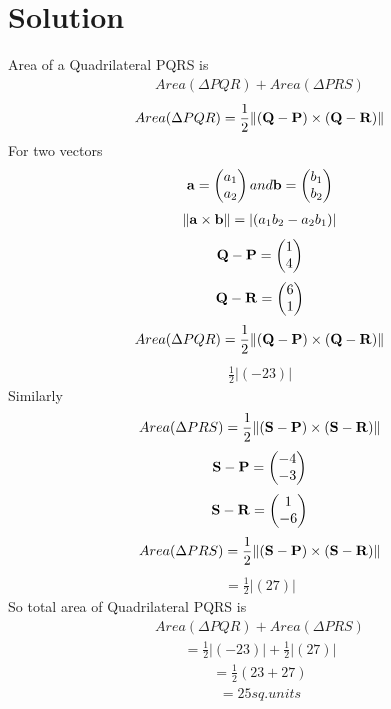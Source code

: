 \documentclass[journal,12pt,twocolumn]{IEEEtran}
\begin{document}
\section*{\textbf{Solution}}
\noindent
Area of a Quadrilateral PQRS is 
\begin{align}
Area (\Delta PQR)+ Area (\Delta PRS)
\end{align}
\begin{align}
Area (\Delta PQR)=
\frac{1}{2}\lVert(\mathbf{Q}-\mathbf{P})\times(\mathbf{Q}-\mathbf{R})\rVert
\end{align}
For two vectors
\begin{align}
\mathbf{a}=\begin{pmatrix}a_1\\a_2\end{pmatrix} and  \mathbf{b}=\begin{pmatrix}b_1\\b_2\end{pmatrix}
\end{align}
\begin{align}
\lVert\mathbf{\mathbf{a}\times\mathbf{b}}\rVert=|(a_1b_2-a_2b_1)|
\end{align}
\begin{align}
\mathbf{Q-P}=\begin{pmatrix}1\\4\end{pmatrix}
\end{align}
\begin{align}
\mathbf{Q-R}=\begin{pmatrix}6\\1\end{pmatrix}
\end{align}
\begin{align}
Area (\Delta PQR)=
\frac{1}{2}\lVert\mathbf{(\mathbf{Q}-\mathbf{P})\times(\mathbf{Q}-\mathbf{R})}\rVert
\end{align}
\begin{align}
\frac{1}{2}\left|(-23)\right|
\end{align}
Similarly 
\begin{align}
Area (\Delta PRS)=
\frac{1}{2}\lVert\mathbf{(\mathbf{S}-\mathbf{P})\times(\mathbf{S}-\mathbf{R})}\rVert
\end{align}
\begin{align}
\mathbf{S-P}=\begin{pmatrix}-4\\-3\end{pmatrix}
\end{align}
\begin{align}
\mathbf{S-R}=\begin{pmatrix}1\\-6\end{pmatrix}
\end{align}
\begin{align}
Area (\Delta PRS)=
\frac{1}{2}\lVert\mathbf{(\mathbf{S}-\mathbf{P})\times(\mathbf{S}-\mathbf{R})}\rVert
\end{align}
\begin{align}
=\frac{1}{2}|(27)|    
\end{align}
So total area of Quadrilateral PQRS is 
\begin{align}
Area (\Delta PQR)+Area (\Delta PRS)
\end{align}
\begin{align}
=\frac{1}{2}|(-23)|+\frac{1}{2}|(27)|
\end{align}
\begin{align}
=\frac{1}{2}(23+27)
\end{align}
\begin{align}
=25 sq.units
\end{align}
\end{document}
